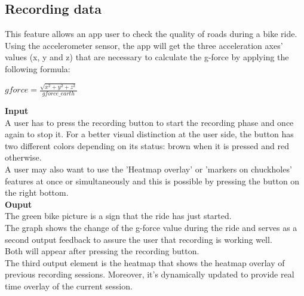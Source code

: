 \documentclass[10pt,a4paper]{article} %
\begin{document}
    \subsection{ Recording data}
    	This feature allows an app user to check the quality of roads during a bike ride.
    	Using the accelerometer sensor, the app will get the three acceleration axes' values (x, y and z) that are necessary to calculate the g-force by applying the following formula:

    
	\begin{center}
		$ gforce = \frac{\sqrt{x^2 + y^2 + z^2}}{gforce\_earth} $
	\end{center}
	\noindent
    \textbf{Input}\\
    A user has to press the recording button to start the recording phase and once again to stop it.
    For a better visual distinction at the user side, the button has two different colors depending on its status: brown when it is pressed and red otherwise.\\
    A user may also want to use the 'Heatmap overlay'  or 'markers on chuckholes' features at once or simultaneously and this is possible by pressing the button on the right bottom.\\
    \textbf{Ouput}\\
    The green bike picture is a sign that the ride has just started.\\
    The graph shows the change of the g-force value during the ride and serves as a second output feedback to assure the user that recording is working well.\\
    Both will appear after pressing the recording button.\\
    The third output element is the heatmap that shows the heatmap overlay of previous recording sessions. Moreover, it's dynamically updated to provide real time overlay of the current session.
    
\end{document}
